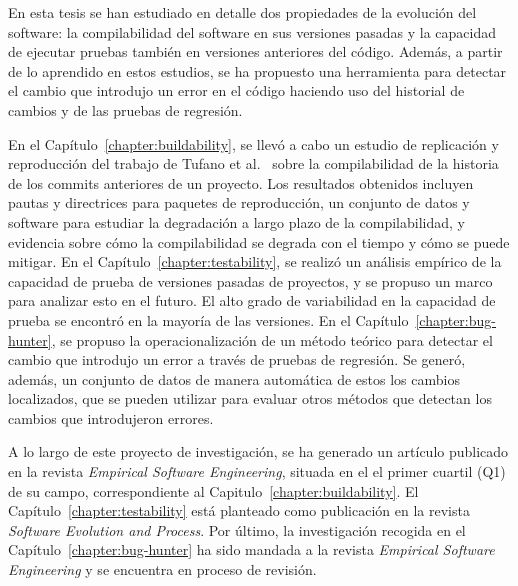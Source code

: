 En esta tesis se han estudiado en detalle dos propiedades de la evolución del software: la compilabilidad del software en sus versiones pasadas y la capacidad de ejecutar pruebas también en versiones anteriores del código. 
Además, a partir de lo aprendido en estos estudios, se ha propuesto una herramienta para detectar el cambio que introdujo un error en el código haciendo uso del historial de cambios y de las pruebas de regresión. 

En el Capítulo~\ref{chapter:buildability}, se llevó a cabo un estudio de replicación y reproducción del trabajo de Tufano et al.~\cite{tufano2017there} sobre la compilabilidad de la historia de los commits anteriores de un proyecto. Los resultados obtenidos incluyen pautas y directrices para paquetes de reproducción, un conjunto de datos y software para estudiar la degradación a largo plazo de la compilabilidad, y evidencia sobre cómo la compilabilidad se degrada con el tiempo y cómo se puede mitigar. 
En el Capítulo~\ref{chapter:testability}, se realizó un análisis empírico de la capacidad de prueba de versiones pasadas de proyectos, y se propuso un marco para analizar esto en el futuro. El alto grado de variabilidad en la capacidad de prueba se encontró en la mayoría de las versiones. 
En el Capítulo~\ref{chapter:bug-hunter}, se propuso la operacionalización de un método teórico para detectar el cambio que introdujo un error a través de pruebas de regresión. 
Se generó, además, un conjunto de datos de manera automática de estos los cambios localizados, que se pueden utilizar para evaluar otros métodos que detectan los cambios que introdujeron errores.

A lo largo de este proyecto de investigación, se ha generado un artículo publicado en la revista \textit{Empirical Software Engineering}, situada en el el primer cuartil (Q1) de su campo, correspondiente al Capitulo~\ref{chapter:buildability}. 
El Capítulo~\ref{chapter:testability} está planteado como publicación en la revista \textit{Software Evolution and Process}. 
Por último, la investigación recogida en el Capítulo~\ref{chapter:bug-hunter} ha sido mandada a la revista \textit{Empirical Software Engineering} y se encuentra en proceso de revisión.

